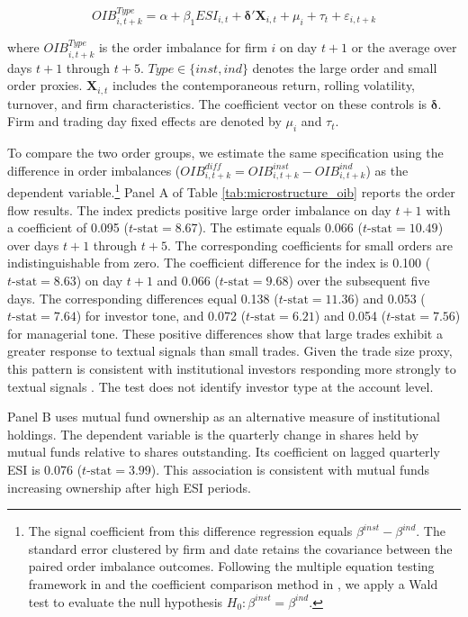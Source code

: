 \documentclass[12pt]{article}
\begin{document}
\begin{equation}
    OIB^{Type}_{i, t+k} = \alpha + \beta_1 ESI_{i,t} + \boldsymbol{\delta}'\mathbf{X}_{i,t} + \mu_i + \tau_t + \varepsilon_{i, t+k}
\end{equation}

\noindent where $OIB^{Type}_{i,t+k}$ is the order imbalance for firm $i$ on day $t+1$ or the average over days $t+1$ through $t+5$. $Type \in \{inst,ind\}$ denotes the large order and small order proxies. $\mathbf{X}_{i,t}$ includes the contemporaneous return, rolling volatility, turnover, and firm characteristics. The coefficient vector on these controls is $\boldsymbol{\delta}$. Firm and trading day fixed effects are denoted by $\mu_i$ and $\tau_t$.

To compare the two order groups, we estimate the same specification using the difference in order imbalances ($OIB^{diff}_{i,t+k} = OIB^{inst}_{i,t+k} - OIB^{ind}_{i,t+k}$) as the dependent variable.\footnote{The signal coefficient from this difference regression equals $\beta^{inst} - \beta^{ind}$. The standard error clustered by firm and date retains the covariance between the paired order imbalance outcomes. Following the multiple equation testing framework in \citet{zellner1962} and the coefficient comparison method in \citet{lou2019}, we apply a Wald test to evaluate the null hypothesis $H_0: \beta^{inst} = \beta^{ind}$.} Panel A of Table \ref{tab:microstructure_oib} reports the order flow results. The index predicts positive large order imbalance on day $t+1$ with a coefficient of 0.095 ($t\text{-stat}=8.67$). The estimate equals 0.066 ($t\text{-stat}=10.49$) over days $t+1$ through $t+5$. The corresponding coefficients for small orders are indistinguishable from zero. The coefficient difference for the index is 0.100 ($t\text{-stat}=8.63$) on day $t+1$ and 0.066 ($t\text{-stat}=9.68$) over the subsequent five days. The corresponding differences equal 0.138 ($t\text{-stat}=11.36$) and 0.053 ($t\text{-stat}=7.64$) for investor tone, and 0.072 ($t\text{-stat}=6.21$) and 0.054 ($t\text{-stat}=7.56$) for managerial tone. These positive differences show that large trades exhibit a greater response to textual signals than small trades. Given the trade size proxy, this pattern is consistent with institutional investors responding more strongly to textual signals \citep{boehmere2021}. The test does not identify investor type at the account level.
 
Panel B uses mutual fund ownership as an alternative measure of institutional holdings. The dependent variable is the quarterly change in shares held by mutual funds relative to shares outstanding. Its coefficient on lagged quarterly ESI is 0.076 ($t\text{-stat}=3.99$). This association is consistent with mutual funds increasing ownership after high ESI periods. 
\end{document}
